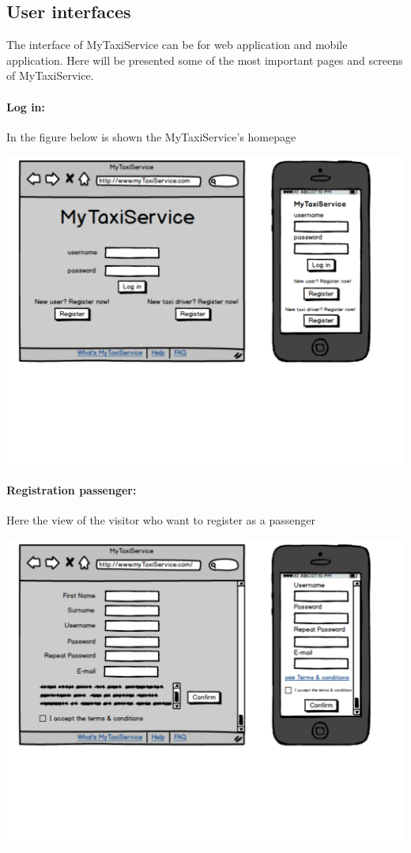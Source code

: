 \subsection{User interfaces}
The interface of MyTaxiService can be for web application and mobile application. Here will be presented some of the most important pages and screens of MyTaxiService.

\paragraph{Log in:}
	In the figure below is shown the MyTaxiService's homepage
	\begin{center}
		\includegraphics[width=\textwidth]{mockup/login.pdf}
	\end{center}
	
\paragraph{Registration passenger:}
	Here the view of the visitor who want to register as a passenger
\begin{center}
	\includegraphics[width=\textwidth]{mockup/registrationPassenger.pdf}
\end{center}

